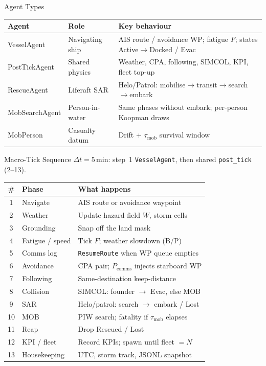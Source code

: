 \documentclass[aspectratio=169]{beamer}
\begin{document}
\begin{frame}{Agent Types}
    \small
    \begin{tabular}{@{}p{3.1cm}p{4.2cm}p{5.2cm}@{}}
        \toprule
        \textbf{Agent} & \textbf{Role} & \textbf{Key behaviour} \\
        \midrule
        VesselAgent & Navigating ship & AIS route / avoidance WP; fatigue $F$; states Active$\to$Docked / Evac \\
        \addlinespace
        PostTickAgent & Shared physics & Weather, CPA, following, SIMCOL, KPI, fleet top-up \\
        \addlinespace
        RescueAgent & Liferaft SAR & Helo/Patrol: mobilise$\to$transit$\to$search$\to$embark \\
        \addlinespace
        MobSearchAgent & Person-in-water & Same phases without embark; per-person Koopman draws \\
        \addlinespace
        MobPerson & Casualty datum & Drift + $\tau_{\text{mob}}$ survival window \\
        \bottomrule
    \end{tabular}
\end{frame}

\begin{frame}{Macro-Tick Sequence}
    \small
    $\Delta t=5$\,min: step~1 \texttt{VesselAgent}, then shared \texttt{post\_tick} (2--13).

    \vspace{0.45em}
    \centering
    \footnotesize
    \begin{tabular}{@{}c l l@{}}
        \toprule
        \textbf{\#} & \textbf{Phase} & \textbf{What happens} \\
        \midrule
        1  & Navigate         & AIS route or avoidance waypoint \\
        2  & Weather          & Update hazard field $W$, storm cells \\
        3  & Grounding        & Snap off the land mask \\
        4  & Fatigue / speed  & Tick $F$; weather slowdown (B/P) \\
        5  & Comms log        & \texttt{ResumeRoute} when WP queue empties \\
        6  & Avoidance        & CPA pair; $P_{\text{comms}}$ injects starboard WP \\
        7  & Following        & Same-destination keep-distance \\
        8  & Collision        & SIMCOL: founder $\to$ Evac, else MOB \\
        9  & SAR              & Helo/patrol: search $\to$ embark / Lost \\
        10 & MOB              & PIW search; fatality if $\tau_{\text{mob}}$ elapses \\
        11 & Reap             & Drop Rescued / Lost \\
        12 & KPI / fleet      & Record KPIs; spawn until fleet $=N$ \\
        13 & Housekeeping     & UTC, storm track, JSONL snapshot \\
        \bottomrule
    \end{tabular}
\end{frame}
\end{document}
